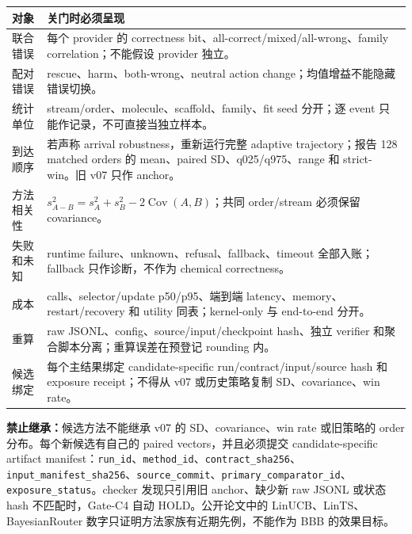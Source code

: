 \documentclass[10pt,letterpaper]{article}
\newcommand{\sect}[1]{\vspace{4pt}{\large\bfseries\color{GuideBlue}#1}\par\vspace{2pt}}
\newenvironment{clean}{\begin{center}\fontsize{8.55}{10.05}\selectfont\setlength{\tabcolsep}{3.7pt}\renewcommand{\arraystretch}{1.04}}{\end{center}}
\begin{document}
\sect{8. 结果分布和误差合同}
\begin{clean}
\begin{tabular}{@{}p{.20\linewidth}p{.66\linewidth}@{}}
\toprule
对象 & 关门时必须呈现\\
\midrule
联合错误 & 每个 provider 的 correctness bit、all-correct/mixed/all-wrong、family correlation；不能假设 provider 独立。\\
配对错误 & rescue、harm、both-wrong、neutral action change；均值增益不能隐藏错误切换。\\
统计单位 & stream/order、molecule、scaffold、family、fit seed 分开；逐 event 只能作记录，不可直接当独立样本。\\
到达顺序 & 若声称 arrival robustness，重新运行完整 adaptive trajectory；报告 128 matched orders 的 mean、paired SD、q025/q975、range 和 strict-win。旧 v07 只作 anchor。\\
方法相关性 & $s^2_{A-B}=s_A^2+s_B^2-2\operatorname{Cov}(A,B)$；共同 order/stream 必须保留 covariance。\\
失败和未知 & runtime failure、unknown、refusal、fallback、timeout 全部入账；fallback 只作诊断，不作为 chemical correctness。\\
成本 & calls、selector/update p50/p95、端到端 latency、memory、restart/recovery 和 utility 同表；kernel-only 与 end-to-end 分开。\\
重算 & raw JSONL、config、source/input/checkpoint hash、独立 verifier 和聚合脚本分离；重算误差在预登记 rounding 内。\\
候选绑定 & 每个主结果绑定 candidate-specific run/contract/input/source hash 和 exposure receipt；不得从 v07 或历史策略复制 SD、covariance、win rate。\\
\bottomrule
\end{tabular}
\end{clean}
\textbf{禁止继承：}候选方法不能继承 v07 的 SD、covariance、win rate 或旧策略的 order 分布。每个新候选有自己的 paired vectors，并且必须提交 candidate-specific artifact manifest：\texttt{run\_id}、\texttt{method\_id}、\texttt{contract\_sha256}、\texttt{input\_manifest\_sha256}、\texttt{source\_commit}、\texttt{primary\_comparator\_id}、\texttt{exposure\_status}。checker 发现只引用旧 anchor、缺少新 raw JSONL 或状态 hash 不匹配时，Gate-C4 自动 HOLD。公开论文中的 LinUCB、LinTS、BayesianRouter 数字只证明方法家族有近期先例，不能作为 BBB 的效果目标。
\end{document}
